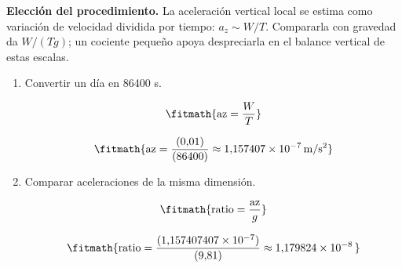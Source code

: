 \noindent\textbf{Elección del procedimiento.} La aceleración vertical local se estima como variación de velocidad dividida por tiempo: $a_z\sim W/T$. Compararla con gravedad da $W/(Tg)$; un cociente pequeño apoya despreciarla en el balance vertical de estas escalas.

\begin{enumerate}

\item Convertir un día en 86400 s.

\[\fitmath{\mathrm{az}=\frac{W}{T}}\]

\[\fitmath{\mathrm{az}=\frac{(0{,}01)}{(86400)}\approx 1{,}157407\times10^{-7}\,\mathrm{m/s^{2}}}\]

\item Comparar aceleraciones de la misma dimensión.

\[\fitmath{\mathrm{ratio}=\frac{\mathrm{az}}{g}}\]

\[\fitmath{\mathrm{ratio}=\frac{(1{,}157407407\times10^{-7})}{(9{,}81)}\approx 1{,}179824\times10^{-8}\,}\]

\end{enumerate}
